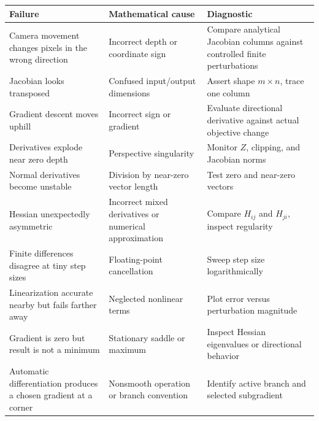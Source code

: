 {\def\LTcaptype{none} %
\begin{longtable}[]{@{}
  >{\raggedright\arraybackslash}p{}
  >{\raggedright\arraybackslash}p{}
  >{\raggedright\arraybackslash}p{}@{}}
\toprule\noalign{}
\begin{minipage}[b]{\linewidth}\raggedright
Failure
\end{minipage} & \begin{minipage}[b]{\linewidth}\raggedright
Mathematical cause
\end{minipage} & \begin{minipage}[b]{\linewidth}\raggedright
Diagnostic
\end{minipage} \\
\midrule\noalign{}
\endhead
\bottomrule\noalign{}
\endlastfoot
Camera movement changes pixels in the wrong direction & Incorrect depth or coordinate sign & Compare analytical Jacobian columns against controlled finite perturbations \\
Jacobian looks transposed & Confused input/output dimensions & Assert shape \(m\times n\), trace one column \\
Gradient descent moves uphill & Incorrect sign or gradient & Evaluate directional derivative against actual objective change \\
Derivatives explode near zero depth & Perspective singularity & Monitor \(Z\), clipping, and Jacobian norms \\
Normal derivatives become unstable & Division by near-zero vector length & Test zero and near-zero vectors \\
Hessian unexpectedly asymmetric & Incorrect mixed derivatives or numerical approximation & Compare \(H_{ij}\) and \(H_{ji}\), inspect regularity \\
Finite differences disagree at tiny step sizes & Floating-point cancellation & Sweep step size logarithmically \\
Linearization accurate nearby but fails farther away & Neglected nonlinear terms & Plot error versus perturbation magnitude \\
Gradient is zero but result is not a minimum & Stationary saddle or maximum & Inspect Hessian eigenvalues or directional behavior \\
Automatic differentiation produces a chosen gradient at a corner & Nonsmooth operation or branch convention & Identify active branch and selected subgradient \\
\end{longtable}
}

